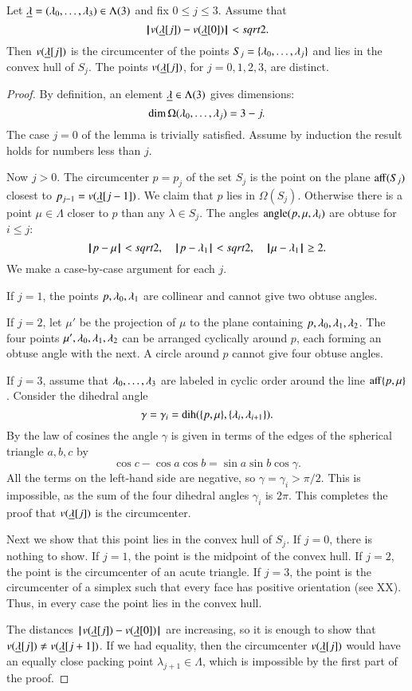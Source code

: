 \begin{lemma}\label{lemma:v2} Let ${\underline{\lambda}}=(\lambda_0,\ldots,\lambda_3)\in\Lambda(3)$ and fix $0\le j\le 3$.  Assume that
$$
{\hskip0.1em|\hskip-0.15em|\hskip0.1em}v({\underline{\lambda}}[j])  -  v({\underline{\lambda}}[0]){\hskip0.1em|\hskip-0.15em|\hskip0.1em} < sqrt2.
$$
Then $v({\underline{\lambda}}[j])$ is the circumcenter of the points $S_j =\{\lambda_0,\ldots,\lambda_j\}$ and
lies in the convex hull of $S_j$.  The points $v({\underline{\lambda}}[j])$, for $j=0,1,2,3$, are distinct.
\end{lemma}

\begin{proof} By definition, an element ${\underline{\lambda}}\in\Lambda(3)$ gives dimensions: 
$$\dim\Omega(\lambda_0,\ldots,\lambda_j) = 3-j.$$  The case $j=0$ of the lemma is trivially
satisfied.  Assume by induction the result holds for numbers less than $j$.

Now $j>0$.
The circumcenter $p=p_{j}$ of the set $S_{j}$ is the point on the plane ${\operatorname{aff}}(S_{j})$
closest to $p_{j-1}=v({\underline{\lambda}}[j-1])$.  We claim that $p$ lies in $\Omega(S_{j})$.  Otherwise
there is a point $\mu\in\Lambda$ closer to $p$ than any $\lambda\in S_{j}$.  
The angles ${{\operatorname{angle}}(p,{\mu,\lambda_i})}$ are obtuse for $i\le j$:
$$
{\hskip0.1em|\hskip-0.15em|\hskip0.1em}p - \mu{\hskip0.1em|\hskip-0.15em|\hskip0.1em} < sqrt2,\quad {\hskip0.1em|\hskip-0.15em|\hskip0.1em}p - \lambda_1{\hskip0.1em|\hskip-0.15em|\hskip0.1em} <sqrt2,\quad {\hskip0.1em|\hskip-0.15em|\hskip0.1em}\mu - \lambda_1{\hskip0.1em|\hskip-0.15em|\hskip0.1em} \ge 2.
$$  
We make a case-by-case
argument for each $j$.

If $j=1$, the points $p,\lambda_0,\lambda_1$ are collinear and cannot give two obtuse angles.

If $j=2$, let $\mu'$ be the projection of $\mu$ to the plane containing
$p,\lambda_0,\lambda_1,\lambda_2$. The four points $\mu',\lambda_0,\lambda_1,\lambda_2$ can be arranged
cyclically around $p$, each forming an obtuse angle with the next.  A circle around $p$
cannot give four obtuse angles.


If $j=3$, assume that $\lambda_0,\ldots,\lambda_3$ are labeled in cyclic order around the line
${\operatorname{aff}}\{p,\mu\}$.  Consider the dihedral angle 
  $$
  \gamma=\gamma_i=\operatorname{dih}(\{p,\mu\},\{\lambda_i,\lambda_{i+1}\}).
  $$
By the law of cosines the angle $\gamma$ is given in terms of the edges of the spherical
triangle $a,b,c$ by
$$
  \cos c - \cos a \cos b = \sin a \sin b \cos \gamma.
$$
All the terms on the left-hand side are negative, so $\gamma =\gamma_i > \pi/2$.
This is impossible, as the sum of the four dihedral angles $\gamma_i$ is $2\pi$.
This completes the proof that $v({\underline{\lambda}}[j])$ is the circumcenter.

Next we show that this point lies in the convex hull of $S_j$.
If $j=0$, there is nothing to show.  If $j=1$, the point is the midpoint of the convex hull.
If $j=2$, the point is the circumcenter of an acute triangle.  If $j=3$, the point is the
circumcenter of a simplex such that every face has positive orientation (see XX).  Thus,
in every case the point lies in the convex hull.

The distances ${\hskip0.1em|\hskip-0.15em|\hskip0.1em}v({\underline{\lambda}}[j]) - v({\underline{\lambda}}[0]){\hskip0.1em|\hskip-0.15em|\hskip0.1em}$ are increasing, so it is enough to show
that $v({\underline{\lambda}}[j])\ne v({\underline{\lambda}}[j+1])$.  If we had equality, then the circumcenter $v({\underline{\lambda}}[j])$
would have an equally close packing point $\lambda_{j+1}\in\Lambda$, which is impossible by the first part of the proof.
\end{proof}

